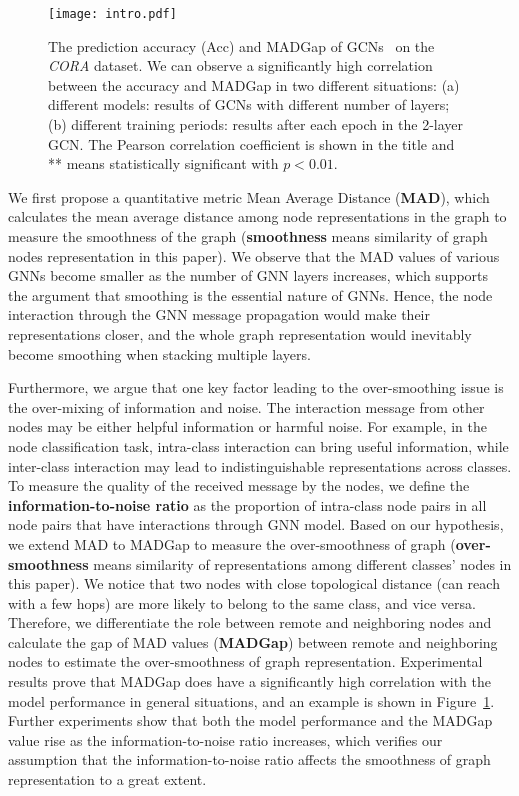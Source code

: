 \documentclass[letterpaper]{article} \usepackage{aaai20}  \usepackage{times}  \usepackage{helvet} \usepackage{courier}  \usepackage[hyphens]{url}  \usepackage{graphicx} \urlstyle{rm} \def\UrlFont{\rm}  \frenchspacing  \setlength{\pdfpagewidth}{8.5in}  \setlength{\pdfpageheight}{11in}  \setcounter{secnumdepth}{0}
\newcommand{\citep}{\cite}
\begin{document}
\begin{figure}[t!]
\centering
\texttt{[image: intro.pdf]}
\caption{The prediction accuracy (Acc) and MADGap of GCNs~\citep{model_gcn} on the \textit{CORA} dataset. We can observe a significantly high correlation between the accuracy and MADGap in two different situations: (a) different models: results of GCNs with different number of layers; (b) different training periods: results after each epoch in the 2-layer GCN. The Pearson correlation coefficient is shown in the title and ** means statistically significant with $p<0.01$.}
\label{figure_introduction}
\end{figure}

We first propose a quantitative metric Mean Average Distance (\textbf{MAD}), which calculates the mean average distance among node representations in the graph to measure the smoothness of the graph (\textbf{smoothness} means similarity of graph nodes representation in this paper). 
We observe that the MAD values of various GNNs become smaller as the number of GNN layers  increases, which supports the argument that smoothing is the essential nature of GNNs. Hence, the node interaction through the GNN message propagation would make their representations closer, and the whole graph representation would inevitably become smoothing when stacking multiple layers.

Furthermore, we argue that one key factor leading to the over-smoothing issue is the over-mixing of information and noise. 
The interaction message from other nodes may be either helpful information or harmful noise.
For example, in the node classification task, intra-class interaction can bring useful information, while inter-class interaction may lead to indistinguishable representations across classes. 
To measure the quality of the received message by the nodes, we define the \textbf{information-to-noise ratio} as the proportion of intra-class node pairs in all node pairs that have interactions through GNN model.
Based on our hypothesis, we extend MAD to MADGap to measure the over-smoothness of graph (\textbf{over-smoothness} means similarity of representations among different classes' nodes in this paper). We notice that two nodes with close topological distance (can reach with a few hops) are more likely to belong to the same class, and vice versa. 
Therefore, we differentiate the role between remote and neighboring nodes and calculate the gap of MAD values (\textbf{MADGap}) between remote and neighboring nodes to estimate the over-smoothness of graph representation.
Experimental results prove that MADGap does have a significantly high correlation with the model performance in general situations, and an example is shown in Figure~\ref{figure_introduction}. 
Further experiments show that both the model performance and the MADGap value rise as the information-to-noise ratio increases, which verifies our assumption that the information-to-noise ratio affects the smoothness of graph representation to a great extent.
\end{document}
